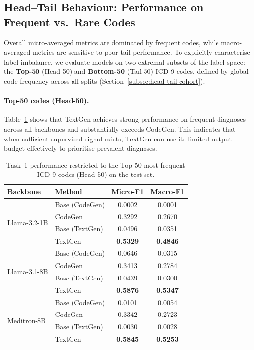 \subsection{Head--Tail Behaviour: Performance on Frequent vs.\ Rare Codes}
\label{subsec:results-task1-headtail}

Overall micro-averaged metrics are dominated by frequent codes, while macro-averaged metrics are sensitive to poor tail performance. To explicitly characterise label imbalance, we evaluate models on two extremal subsets of the label space: the \textbf{Top-50} (Head-50) and \textbf{Bottom-50} (Tail-50) ICD-9 codes, defined by global code frequency across all splits (Section~\ref{subsec:head-tail-cohort}). 

\paragraph{Top-50 codes (Head-50).}
Table~\ref{tab:task1-top50} shows that TextGen achieves strong performance on frequent diagnoses across all backbones and substantially exceeds CodeGen. This indicates that when sufficient supervised signal exists, TextGen can use its limited output budget effectively to prioritise prevalent diagnoses.

\begin{table}[t]
\centering
\caption{Task~1 performance restricted to the Top-50 most frequent ICD-9 codes (Head-50) on the test set.}
\label{tab:task1-top50}
\begin{tabular}{llcc}
\toprule
\textbf{Backbone} & \textbf{Method} & \textbf{Micro-F1} & \textbf{Macro-F1} \\
\midrule
\multirow{4}{*}{Llama-3.2-1B}
& Base (CodeGen) & 0.0002 & 0.0001 \\
& CodeGen        & 0.3292 & 0.2670 \\
& Base (TextGen) & 0.0496 & 0.0351 \\
& TextGen        & \textbf{0.5329} & \textbf{0.4846} \\
\midrule
\multirow{4}{*}{Llama-3.1-8B}
& Base (CodeGen) & 0.0646 & 0.0315 \\
& CodeGen        & 0.3413 & 0.2784 \\
& Base (TextGen) & 0.0439 & 0.0300 \\
& TextGen        & \textbf{0.5876} & \textbf{0.5347} \\
\midrule
\multirow{4}{*}{Meditron-8B}
& Base (CodeGen) & 0.0101 & 0.0054 \\
& CodeGen        & 0.3342 & 0.2723 \\
& Base (TextGen) & 0.0030 & 0.0028 \\
& TextGen        & \textbf{0.5845} & \textbf{0.5253} \\
\bottomrule
\end{tabular}
\end{table}

